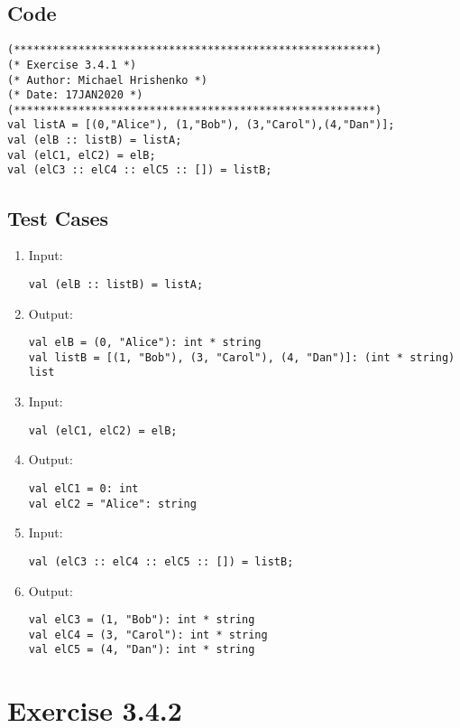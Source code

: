 \documentclass[oneside]{book}
\begin{document}
\section{Code}
    \begin{lstlisting}
(********************************************************)
(* Exercise 3.4.1 *)
(* Author: Michael Hrishenko *)
(* Date: 17JAN2020 *)
(********************************************************)
val listA = [(0,"Alice"), (1,"Bob"), (3,"Carol"),(4,"Dan")];
val (elB :: listB) = listA;
val (elC1, elC2) = elB;
val (elC3 :: elC4 :: elC5 :: []) = listB;
    \end{lstlisting}
\section{Test Cases}
\begin{enumerate}
    \item Input:
        \begin{lstlisting}
val (elB :: listB) = listA;
        \end{lstlisting}
    \item Output:
        \begin{lstlisting}
val elB = (0, "Alice"): int * string
val listB = [(1, "Bob"), (3, "Carol"), (4, "Dan")]: (int * string) list
        \end{lstlisting}
    \item Input:
        \begin{lstlisting}
val (elC1, elC2) = elB;
        \end{lstlisting}
    \item Output:
        \begin{lstlisting}
val elC1 = 0: int
val elC2 = "Alice": string
        \end{lstlisting}
    \item Input:
        \begin{lstlisting}
val (elC3 :: elC4 :: elC5 :: []) = listB;
        \end{lstlisting}
    \item Output:
        \begin{lstlisting}
val elC3 = (1, "Bob"): int * string
val elC4 = (3, "Carol"): int * string
val elC5 = (4, "Dan"): int * string
        \end{lstlisting}
\end{enumerate}

\chapter{Exercise 3.4.2}
\end{document}
